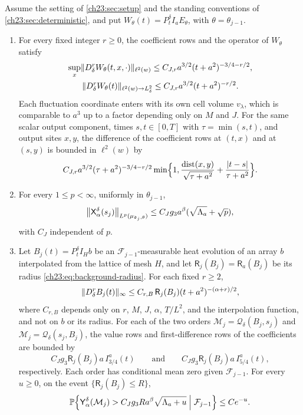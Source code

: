 \begin{theorem}\label{ch23:thm:fresh-and-mixed-rows}
Assume the setting of \cref{ch23:sec:setup} and the standing conventions of \cref{ch23:sec:deterministic}, and put $W_\theta(t)=P_t^\delta I_aE_\theta$, with $\theta=\theta_{j-1}$.
\begin{enumerate}
\item For every fixed integer $r\ge0$, the coefficient rows and the operator of $W_\theta$ satisfy
\begin{gather*}
 \sup_x\lVert D_\delta^rW_\theta(t,x,\cdot)\rVert_{\ell^2(w)}\le C_{J,r}a^{3/2}(t+a^2)^{-3/4-r/2},\\
 \lVert D_\delta^rW_\theta(t)\rVert_{\ell^2(w)\to L_\delta^2}\le C_{J,r}a^{3/2}(t+a^2)^{-r/2}.
\end{gather*}
Each fluctuation coordinate enters with its own cell volume $v_\lambda$, which is comparable to $a^3$ up to a factor depending only on $M$ and $J$. For the same scalar output component, times $s,t\in[0,T]$ with $\tau=\min(s,t)$, and output sites $x,y$, the difference of the coefficient rows at $(t,x)$ and at $(s,y)$ is bounded in $\ell^2(w)$ by
\[
 C_{J,r}a^{3/2}(\tau+a^2)^{-3/4-r/2}\min\Bigl\{1,\frac{\operatorname{dist}(x,y)}{\sqrt{\tau+a^2}}+\frac{\lvert t-s\rvert}{\tau+a^2}\Bigr\}.
\]
\item For every $1\le p<\infty$, uniformly in $\theta_{j-1}$,
\[
 \bigl\|\mathsf X_{\alpha}^{\delta}(s_j)\bigr\|_{L^p(\mu_{\mathfrak d_j,\theta})}\le C_Jg_3a^\beta(\sqrt{\Lambda_a}+\sqrt p),
\]
with $C_J$ independent of $p$.
\item Let $B_j(t)=P_t^\delta I_Hb$ be an $\mathcal F_{j-1}$-measurable heat evolution of an array $b$ interpolated from the lattice of mesh $H$, and let $\mathsf R_j(B_j)=\mathsf R_a(B_j)$ be its radius \eqref{ch23:eq:background-radius}. For each fixed $r\ge2$,
\[
 \lVert D_\delta^rB_j(t)\rVert_\infty\le C_{r,B}\,\mathsf R_j(B_j)(t+a^2)^{-(\alpha+r)/2},
\]
where $C_{r,B}$ depends only on $r$, $M$, $J$, $\alpha$, $T/L^2$, and the interpolation function, and not on $b$ or its radius. For each of the two orders $\mathcal M_j=\mathcal Q_\delta(B_j,s_j)$ and $\mathcal M_j=\mathcal Q_\delta(s_j,B_j)$, the value rows and first-difference rows of the coefficients are bounded by
\[
 C_Jg_3\mathsf R_j(B_j)a\,I_{3/4}^a(t)\qquad\text{and}\qquad C_Jg_3\mathsf R_j(B_j)a\,I_{5/4}^a(t),
\]
respectively. Each order has conditional mean zero given $\mathcal F_{j-1}$. For every $u\ge0$, on the event $\{\mathsf R_j(B_j)\le R\}$,
\[
 \mathbb P\Bigl\{\mathsf Y_{\alpha}^{\delta}(\mathcal M_j)>C_Jg_3Ra^\beta\sqrt{\Lambda_a+u}\Bigm|\mathcal F_{j-1}\Bigr\}\le Ce^{-u}.
\]
\end{enumerate}
\end{theorem}
